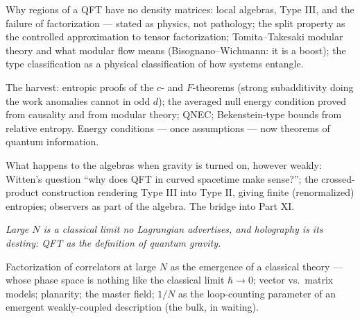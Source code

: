Why regions of a QFT have no density matrices: local algebras, Type III, and the failure of factorization --- stated as physics, not pathology; the split property as the controlled approximation to tensor factorization; Tomita--Takesaki modular theory and what modular flow means (Bisognano--Wichmann: it is a boost); the type classification as a physical classification of how systems entangle.

The harvest: entropic proofs of the $c$- and $F$-theorems (strong subadditivity doing the work anomalies cannot in odd $d$); the averaged null energy condition proved from causality and from modular theory; QNEC; Bekenstein-type bounds from relative entropy. Energy conditions --- once assumptions --- now theorems of quantum information.

What happens to the algebras when gravity is turned on, however weakly: Witten's question ``why does QFT in curved spacetime make sense?''; the crossed-product construction rendering Type III into Type II, giving finite (renormalized) entropies; observers as part of the algebra. The bridge into Part XI.


\noin \emph{Large $N$ is a classical limit no Lagrangian advertises, and holography is its destiny: QFT as the definition of quantum gravity.}

Factorization of correlators at large $N$ as the emergence of a classical theory --- whose phase space is nothing like the classical limit $\hbar \to 0$; vector vs.\ matrix models; planarity; the master field; $1/N$ as the loop-counting parameter of an emergent weakly-coupled description (the bulk, in waiting).

